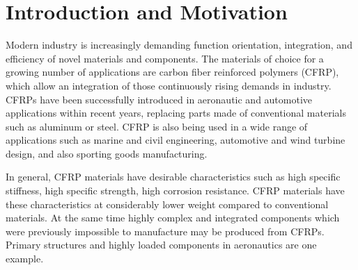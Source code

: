 


\section{Introduction and Motivation}
\label{sec:intro}
Modern industry is increasingly demanding function orientation, integration, and efficiency of novel materials and components. The materials of choice for a growing number of applications are carbon fiber reinforced polymers (CFRP), which allow an integration of those continuously rising demands in industry. CFRPs have been successfully introduced in aeronautic and automotive applications within recent years, replacing  parts made of conventional materials such as aluminum or steel. CFRP is also being used in a wide range of applications such as marine and civil engineering, automotive and wind turbine design, and also sporting goods manufacturing. 

In general, CFRP materials have desirable characteristics such as high specific stiffness, high specific strength, high corrosion resistance. CFRP materials have these characteristics  at considerably lower weight compared to conventional materials.
At the same time highly complex and integrated components which were previously impossible to manufacture may be produced from CFRPs.
Primary structures and highly loaded components in aeronautics are one example.




